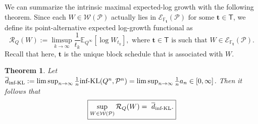 \documentclass[11pt]{article}
\newcommand{\infKL}{\textnormal{inf-KL}}
\newcommand{\E}{\mathbb{E}}
\newcommand{\Pcal}{\mathcal{P}}
\newcommand{\bbF}{\mathbb F}
\newcommand{\bt}{\mathbf t}
\newcommand{\Tdet}{\mathsf T}
\newcommand{\Wcal}{\mathcal W}
\newtheorem{theorem}{Theorem}[section]
\theoremstyle{definition}
\theoremstyle{definition}
\begin{document}
We can summarize the intrinsic maximal expected-log growth with the following theorem. Since each $W\in\Wcal(\Pcal)$ actually lies in $\mathcal E_{\bbF_{\bt}}(\Pcal)\text{ for some }\bt\in\Tdet$, we define its point-alternative expected log-growth functional as
\[
\mathcal R_Q(W):= \limsup_{k\to\infty}\frac{1}{t_k}\E_{Q^\infty}[\log W_{t_k}],  \text{ where } \bt\in\Tdet \text{ is such that } W\in\mathcal E_{\bbF_{\bt}}(\Pcal).
\]
Recall that here, $\bt$ is the unique block schedule that is associated with $W$.

\begin{theorem}\label{thm:max-eprocess-rate}
Let $\overline d_{\infKL}:=\limsup_{n\to\infty}\frac{1}{n}\infKL(Q^n,\Pcal^n) =\limsup_{n\to\infty}\frac{1}{n}a_n\in[0,\infty]$. Then it follows that
\[
\boxed{
\sup_{W\in\Wcal(\Pcal)}\mathcal R_Q(W)=\ \overline d_{\infKL}.
}
\]
\end{theorem}
\end{document}
